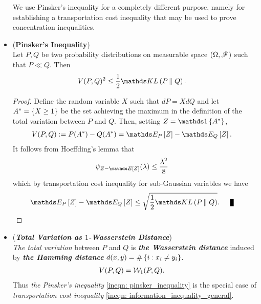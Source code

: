 \documentclass[11pt]{article}
\begin{document}
\begin{itemize}
\begin{remark}
We use Pinsker's inequality for a completely different purpose, namely for establishing a transportation cost inequality that may be used to prove concentration inequalities. 
\end{remark}

\item \begin{proposition} (\textbf{Pinsker's Inequality}) \citep{thomas2006elements, boucheron2013concentration} \\
Let $P, Q$ be two probability distributions on measurable space $(\Omega, {\mathscr F})$ such that $P \ll Q$. Then
\begin{align}
V(P, Q)^2 &\le \frac{1}{2}\kl{P}{Q}. \label{ineqn: pinsker_inequality}
\end{align}
\end{proposition}
\begin{proof}
Define the random variable $X$ such that $dP = X dQ$ and let $A^{*} = \left\{X \ge 1\right\}$ be the set achieving the maximum in the definition of the total variation between $P$ and $Q$. Then, setting $Z = \ind{A^{*}}$, 
\begin{align*}
V(P,Q) &:= P(A^{*}) - Q(A^{*}) = \E{P}{Z} - \E{Q}{Z}.
\end{align*} It follows from Hoeffding's lemma that
\begin{align*}
\psi_{Z - \E{}{Z}}(\lambda) &\le \frac{\lambda^2}{8}
\end{align*} which by transportation cost inequality for sub-Gaussian variables we have
\begin{align*}
\E{P}{Z} - \E{Q}{Z} &\le \sqrt{\frac{1}{2}\kl{P}{Q}}. \qed
\end{align*}
\end{proof}


\item \begin{remark} (\textbf{\emph{Total Variation as $1$-Wasserstein Distance}})\\
\emph{The total variation} between $P$ and $Q$ is \emph{\textbf{the Wasserstein distance}} induced by \emph{\textbf{the Hamming distance}} $d(x, y) = \#\left\{i: x_i \neq y_i\right\}$.
\begin{align*}
V(P, Q) &= {\mathcal W}_1(P, Q).
\end{align*} Thus \emph{the Pinsker's inequality} \eqref{ineqn: pinsker_inequality} is the special case of \emph{transportation cost inequality} \eqref{ineqn: information_inequality_general}.
\end{remark}
\end{itemize}
\end{document}
